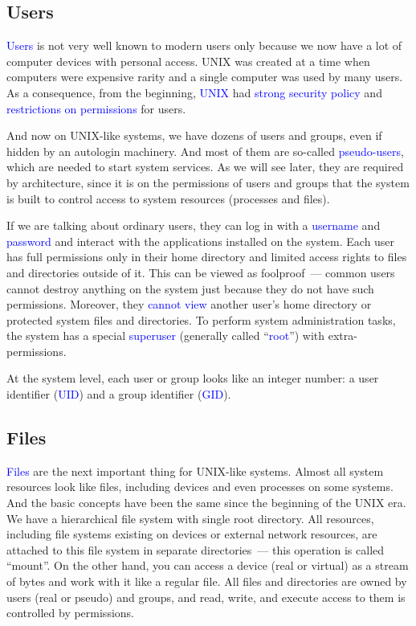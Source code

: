 \documentclass[12pt]{report}
\newcommand{\struct}[1]{\textcolor{blue}{#1}}
\begin{document}
\subsection*{Users}

\struct{Users} is not very well known to modern users only because
we now have a lot of computer devices with personal access.
UNIX was created at a time when computers were expensive rarity and
a single computer was used by many users. As a consequence, from the beginning,
\struct{UNIX} had \struct{strong security policy} and
\struct{restrictions on permissions} for users.

\medskip
And now on UNIX-like systems, we have dozens of users and groups,
even if hidden by an autologin machinery. And most of them are so-called
\struct{pseudo-users}, which are needed to start system services.
As we will see later, they are required by architecture, since it is on
the permissions of users and groups that the system is built to control
access to system resources (processes and files).

\medskip
If we are talking about ordinary users, they can log in with a \struct{username}
and \struct{password} and interact with the applications installed on the system.
Each user has full permissions only in their home directory and limited
access rights to files and directories outside of it. This can be viewed
as foolproof~--- common users cannot destroy anything on the system just
because they do not have such permissions. Moreover, they \struct{cannot view}
another user's home directory or protected system files and directories.
To perform system administration tasks, the system has a special
\struct{superuser} (generally called ``\struct{root}'') with extra-permissions.

\medskip
At the system level, each user or group looks like an integer number:
a user identifier (\struct{UID}) and a group identifier (\struct{GID}).

\subsection*{Files}

\struct{Files} are the next important thing for UNIX-like systems. Almost
all system resources look like files, including devices and even
processes on some systems. And the basic concepts have been the same
since the beginning of the UNIX era. We have a hierarchical file system
with single root directory. All resources, including file systems
existing on devices or external network resources, are attached to this
file system in separate directories~--- this operation is called
``mount''. On the other hand, you can access a device (real or virtual)
as a stream of bytes and work with it like a regular file. All files and
directories are owned by users (real or pseudo) and groups, and read,
write, and execute access to them is controlled by permissions.
\end{document}
